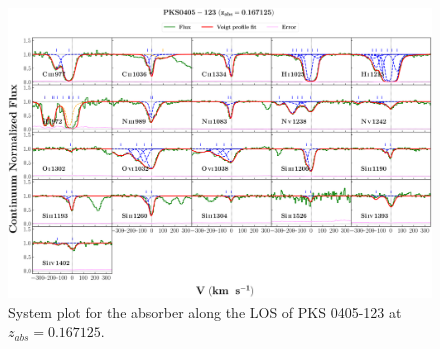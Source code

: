   
  
  \newpage
  \thispagestyle{empty}

  \begin{landscape}
  
  \begin{figure}
      \centering
      \vspace{-10mm}
      \hspace*{-20mm}
      \includegraphics[width=1.1\linewidth]{System-Plots/PKS0405-123_z=0.167125_sys_plot.png}
      \caption{System plot for the absorber along the LOS of PKS 0405-123 at $z_{abs} = 0.167125$. }
  \end{figure}
  
  \end{landscape}

  
